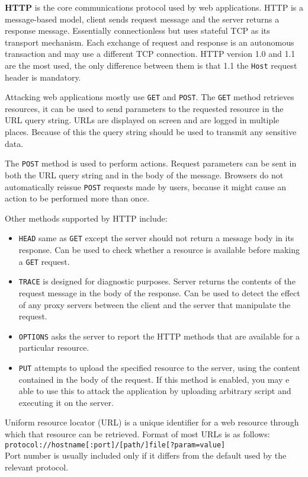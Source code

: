 \textbf{HTTP} is the core communications protocol used by web applications.
HTTP is a message-based model, client sends request message and the server returns a response message.
Essentially connectionless but uses stateful TCP as its transport mechanism.
Each exchange of request and response is an autonomous transaction and may use a different TCP connection.
HTTP version 1.0 and 1.1 are the most used, the only difference between them is that 1.1 the \verb|Host| request header is mandatory.

Attacking web applications mostly use \verb|GET| and \verb|POST|. 
The \verb|GET| method retrieves resources, it can be used to send parameters to the requested resource in the URL query string.
URLs are displayed on screen and are logged in multiple places. 
Because of this the query string should be used to transmit any sensitive data.

The \verb|POST| method is used to perform actions.
Request parameters can be sent in both the URL query string and in the body of the message.
Browsers do not automatically reissue \verb|POST| requests made by users, because it might cause an action to be performed more than once.

Other methods supported by HTTP include:
\begin{itemize}
    \item \verb|HEAD| same as \verb|GET| except the server should not return a message body in its response.
    Can be used to check whether a resource is available before making a \verb|GET| request.
    \item \verb|TRACE| is designed for diagnostic purposes.
    Server returns the contents of the request message in the body of the response.
    Can be used to detect the effect of any proxy servers between the client and the server that manipulate the request.
    \item \verb|OPTIONS| asks the server to report the HTTP methods that are available for a particular resource.
    \item \verb|PUT| attempts to upload the specified resource to the server, using the content contained in the body of the request.
    If this method is enabled, you may e able to use this to attack the application by uploading arbitrary script and executing it on the server.
\end{itemize}

Uniform resource locator (URL) is a unique identifier for a web resource through which that resource can be retrieved.
Format of most URLs is as follows:\\
\verb|protocol://hostname[:port]/[path/]file[?param=value]|\\
Port number is usually included only if it differs from the default used by the relevant protocol.

